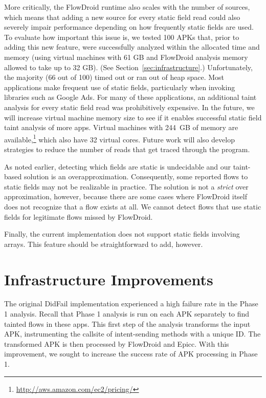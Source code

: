 More critically, the FlowDroid runtime also scales with the number of sources, which means that adding a new source for every static field read could also severely impair performance depending on how frequently static fields are used. To evaluate how important this issue is, we tested 100 APKs that, prior to adding this new feature, were successfully analyzed within the allocated time and memory (using virtual machines with 61 GB and FlowDroid analysis memory allowed to take up to 32 GB). (See Section~\ref{sec:infrastructure}.) Unfortunately, the majority (66 out of 100) timed out or ran out of heap space. Most applications make frequent use of static fields, particularly when invoking libraries such as Google Ads. For many of these applications, an additional taint analysis for every static field read was prohibitively expensive. In the future, we will increase virtual machine memory size to see if it enables successful static field taint analysis of more apps. Virtual machines with 244~GB of memory are available,\footnote{\url{http://aws.amazon.com/ec2/pricing/}} which also have 32 virtual cores. Future work will also develop strategies to reduce the number of reads that get traced through the program. 

As noted earlier, detecting which fields are static is undecidable and our taint-based solution is an overapproximation. Consequently, some reported flows to static fields may not be realizable in practice. The solution is not a \emph{strict} over approximation, however, because there are some cases where FlowDroid itself does not recognize that a flow exists at all. We cannot detect flows that use static fields for legitimate flows missed by FlowDroid. 

Finally, the current implementation does not support static fields involving arrays. This feature should be straightforward to add, however.


\chapter{Infrastructure Improvements} \label{chap:infrastructure}
\label{sec:infrastructure}
The original DidFail implementation experienced a high failure rate in the Phase 1 analysis.  Recall that Phase 1 analysis is run on each APK separately to find tainted flows in these apps.  This first step of the analysis transforms the input APK, instrumenting the callsite of intent-sending methods with a unique ID.  The transformed APK is then processed by FlowDroid and Epicc.  With this improvement, we sought to increase the success rate of APK processing in Phase 1.

